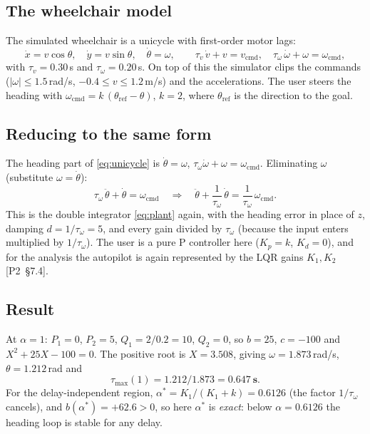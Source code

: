\documentclass[11pt,a4paper]{article}
\newcommand{\ptwo}[1]{{\small\textsf{[P2~\S#1]}}}
\theoremstyle{definition}
\begin{document}
\subsection{The wheelchair model}
The simulated wheelchair is a unicycle with first-order motor lags:
\begin{equation}
\dot x = v\cos\theta,\quad \dot y = v\sin\theta,\quad \dot\theta = \omega,
\qquad
\tau_v\,\dot v + v = v_{\mathrm{cmd}},\quad
\tau_\omega\,\dot\omega + \omega = \omega_{\mathrm{cmd}},
\label{eq:unicycle}
\end{equation}
with $\tau_v = 0.30$\,s and $\tau_\omega = 0.20$\,s. On top of this the
simulator clips the commands ($|\omega| \le 1.5$\,rad/s,
$-0.4 \le v \le 1.2$\,m/s) and the accelerations. The user steers the
heading with $\omega_{\mathrm{cmd}} = k\,(\theta_{\mathrm{ref}} - \theta)$,
$k = 2$, where $\theta_{\mathrm{ref}}$ is the direction to the goal.

\subsection{Reducing to the same form}
The heading part of \eqref{eq:unicycle} is
$\dot\theta = \omega$, $\tau_\omega\dot\omega + \omega = \omega_{\mathrm{cmd}}$.
Eliminating $\omega$ (substitute $\omega = \dot\theta$):
\[
\tau_\omega\,\ddot\theta + \dot\theta = \omega_{\mathrm{cmd}}
\quad\Longrightarrow\quad
\ddot\theta + \frac{1}{\tau_\omega}\,\dot\theta = \frac{1}{\tau_\omega}\,\omega_{\mathrm{cmd}} .
\]
This is the double integrator \eqref{eq:plant} again, with the heading
error in place of $z$, damping $d = 1/\tau_\omega = 5$, and every gain
divided by $\tau_\omega$ (because the input enters multiplied by
$1/\tau_\omega$). The user is a pure P controller here ($K_p = k$,
$K_d = 0$), and for the analysis the autopilot is again represented by
the LQR gains $K_1, K_2$ \ptwo{7.4}.

\subsection{Result}
At $\alpha = 1$: $P_1 = 0$, $P_2 = 5$, $Q_1 = 2/0.2 = 10$, $Q_2 = 0$, so
$b = 25$, $c = -100$ and $X^2 + 25X - 100 = 0$. The positive root is
$X = 3.508$, giving $\omega = 1.873$\,rad/s, $\theta = 1.212$\,rad and
\[
\tau_{\max}(1) = 1.212/1.873 = \mathbf{0.647\ s}.
\]
For the delay-independent region,
$\alpha^* = K_1/(K_1 + k) = 0.6126$ (the factor $1/\tau_\omega$ cancels),
and $b(\alpha^*) = +62.6 > 0$, so here $\alpha^*$ is \emph{exact}: below
$\alpha = 0.6126$ the heading loop is stable for any delay.
\end{document}
